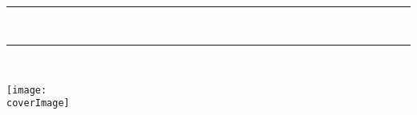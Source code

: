  

  \newlength{\cambioIzquierdo} \setlength{\cambioIzquierdo}{1in + \hoffset +
    \oddsidemargin}

  \newlength{\cambioDerecho} \setlength{\cambioDerecho}{\cambioIzquierdo +
    \textwidth} \setlength{\cambioDerecho}{\paperwidth - \cambioDerecho}


  \newlength{\margenPortada} \setlength{\margenPortada}{3.5cm}

  \setlength{\cambioIzquierdo}{\cambioIzquierdo - \margenPortada}
  \setlength{\cambioDerecho}{\cambioDerecho - \margenPortada}

  
  \thispagestyle{empty}


  \newlength{\evensidemarginOriginal}
  \setlength{\evensidemarginOriginal}{\evensidemargin}

  \newlength{\oddsidemarginOriginal}
  \setlength{\oddsidemarginOriginal}{\oddsidemargin}

  \setlength{\evensidemargin}{0cm} \setlength{\oddsidemargin}{0cm}

  \begin{huge}
    \mbox{ } \vfill %
    \begin{center}
      \rule{\linewidth}{.5mm}\leavevmode \\\relax \vskip 1cm
      \textbf{\ltitle} \vskip 0.7cm
      \rule{\linewidth}{.5mm}\leavevmode \\\relax
    \end{center}
  \end{huge}

  \vfill %

\begin{center}
  \texttt{[image: \\coverImage]}
\end{center}

\vfill %

\begin{center}
  {\Large \textbf{\doctype}} \\[2em]
  \degree
\end{center}

\vfill

